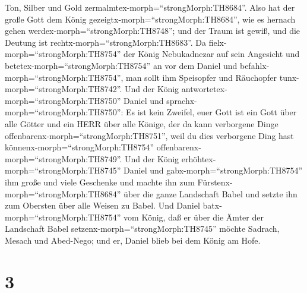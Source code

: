 Ton, Silber und Gold zermalmtex-morph=``strongMorph:TH8684''. Also hat
der große Gott dem König gezeigtx-morph=``strongMorph:TH8684'', wie es
hernach gehen werdex-morph=``strongMorph:TH8748''; und der Traum ist
gewiß, und die Deutung ist rechtx-morph=``strongMorph:TH8683''.
 Da fielx-morph=``strongMorph:TH8754'' der König
Nebukadnezar auf sein Angesicht und betetex-morph=``strongMorph:TH8754''
an vor dem Daniel und befahlx-morph=``strongMorph:TH8754'', man sollt
ihm Speisopfer und Räuchopfer tunx-morph=``strongMorph:TH8742''.
 Und der König antwortetex-morph=``strongMorph:TH8750''
Daniel und sprachx-morph=``strongMorph:TH8750'': Es ist kein Zweifel,
euer Gott ist ein Gott über alle Götter und ein HERR über alle Könige,
der da kann verborgene Dinge offenbarenx-morph=``strongMorph:TH8751'',
weil du dies verborgene Ding hast könnenx-morph=``strongMorph:TH8754''
offenbarenx-morph=``strongMorph:TH8749''.  Und der König
erhöhtex-morph=``strongMorph:TH8745'' Daniel und
gabx-morph=``strongMorph:TH8754'' ihm große und viele Geschenke und
machte ihn zum Fürstenx-morph=``strongMorph:TH8684'' über die ganze
Landschaft Babel und setzte ihn zum Obersten über alle Weisen zu Babel.
 Und Daniel batx-morph=``strongMorph:TH8754'' vom König,
daß er über die Ämter der Landschaft Babel
setzenx-morph=``strongMorph:TH8745'' möchte Sadrach, Mesach und
Abed-Nego; und er, Daniel blieb bei dem König am Hofe.

\hypertarget{section-2}{%
\section{3}\label{section-2}}


